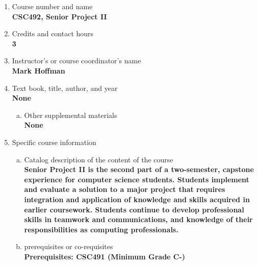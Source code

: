 \label{CSC492}  %
\begin{enumerate}[1.]
\item Course number and name\\
  {\bfseries
    CSC492, Senior Project II
  }
  
\item Credits and contact hours\\
  {\bfseries
    3  %
  }

\item Instructor's or course coordinator's name\\
  {\bfseries
    Mark Hoffman    
  }

\item Text book, title, author, and year\\
  {\bfseries
    None    
  }
\begin{enumerate}[a.]
\item Other supplemental materials\\
  {\bfseries
    None    
  }
\end{enumerate}

\item Specific course information
\begin{enumerate}[a.]  
\item Catalog description of the content of the course\\
  {\bfseries
Senior Project II is the second part of a two-semester, capstone experience for computer science students. Students implement and evaluate a solution to a major project that requires integration and application of knowledge and skills acquired in earlier coursework. Students continue to develop professional skills in teamwork and communications, and knowledge of their responsibilities as computing professionals.
}

\item prerequisites or co-requisites\\
  {\bfseries
    Prerequisites: CSC491 (Minimum Grade C-) \\  %
  }


\end{enumerate}
\end{enumerate}
